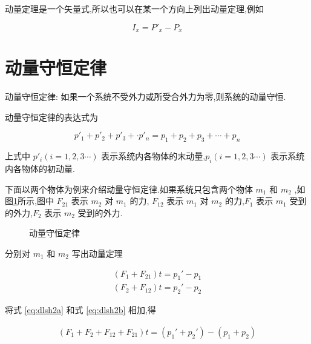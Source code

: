 动量定理是一个矢量式,所以也可以在某一个方向上列出动量定理,例如

\begin{equation}
  I_x=P'_x-P_x
  \label{eq:dldlsub}
\end{equation}

\section{动量守恒定律}

动量守恒定律: 如果一个系统不受外力或所受合外力为零,则系统的动量守恒.

动量守恒定律的表达式为

\begin{equation}
  p'_1+p'_2+p'_3+\cdot p'_n = p_1+p_2+p_3+\cdots +p_n
  \label{eq:dlsh}
\end{equation}

上式中 $p'_i (i=1,2,3\cdots)$ 表示系统内各物体的末动量,$p_i (i=1,2,3\cdots)$ 表示系统内各物体的初动量.

下面以两个物体为例来介绍动量守恒定律.如果系统只包含两个物体 $m_1$ 和 $m_2$ ,如图\ref{fig:dlsh1}所示,图中 $F_{21}$ 表示 $m_2$ 对 $m_1$ 的力, $F_{12}$ 表示 $m_1$ 对 $m_2$ 的力,$F_1$ 表示 $m_1$ 受到的外力,$F_2$ 表示 $m_2$ 受到的外力.

\begin{figure}[H]
  \centering
  \caption{动量守恒定律}
  \label{fig:dlsh1}
\end{figure}

分别对 $m_1$ 和 $m_2$ 写出动量定理

\begin{gather}
  (F_1+F_{21})t=p_1'-p_1 \label{eq:dlsh2a}\\
  (F_2+F_{12})t=p_2'-p_2 \label{eq:dlsh2b}
\end{gather}

将式 \eqref{eq:dlsh2a} 和式 \eqref{eq:dlsh2b} 相加,得

\begin{gather}
  (F_1+F_2+F_{12}+F_{21})t=(p_1'+p_2')-(p_1+p_2)
  \label{eq:xtdlsh}
\end{gather}

